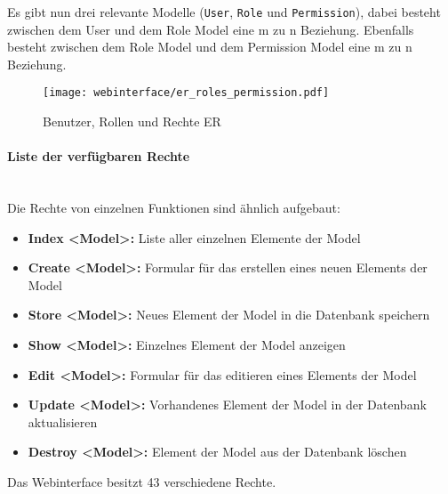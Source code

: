 Es gibt nun drei relevante Modelle (\verb|User|, \verb|Role| und \verb|Permission|), dabei
besteht zwischen dem User und dem Role Model eine m zu n Beziehung. Ebenfalls
besteht zwischen dem Role Model und dem Permission Model eine m zu n Beziehung.

\begin{figure}[H]
  \centering
  \texttt{[image: webinterface/er\_roles\_permission.pdf]}
  \caption{Benutzer, Rollen und Rechte ER}
\end{figure}

\paragraph{Liste der verfügbaren Rechte}\mbox{}\\

Die Rechte von einzelnen Funktionen sind ähnlich aufgebaut:

\begin{itemize}
  \item \textbf{Index <Model>:} Liste aller einzelnen Elemente der Model
  \item \textbf{Create <Model>:} Formular für das erstellen eines neuen
  Elements der Model
  \item \textbf{Store <Model>:} Neues Element der Model in die Datenbank speichern
  \item \textbf{Show <Model>:} Einzelnes Element der Model anzeigen
  \item \textbf{Edit <Model>:} Formular für das editieren eines Elements der
  Model
  \item \textbf{Update <Model>:} Vorhandenes Element der Model in der
  Datenbank aktualisieren
  \item \textbf{Destroy <Model>:} Element der Model aus der Datenbank löschen
\end{itemize}

Das Webinterface besitzt 43 verschiedene Rechte.

